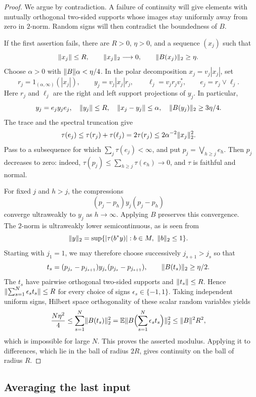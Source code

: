 \begin{proof}
We argue by contradiction.  A failure of continuity will give elements
with mutually orthogonal two-sided supports whose images stay uniformly
away from zero in $2$-norm.  Random signs will then contradict the
boundedness of $B$.

If the first assertion fails, there are $R>0$, $\eta>0$, and a sequence
$(x_j)$ such that
\[
 \lVert x_j\rVert\le R,\qquad \lVert x_j\rVert_2\longrightarrow0,
 \qquad \lVert B(x_j)\rVert_2\ge\eta.
\]
Choose $\alpha>0$ with $\lVert B\rVert\alpha<\eta/4$.  In the polar
decomposition $x_j=v_j|x_j|$, set
\[
 r_j=1_{(\alpha,\infty)}(|x_j|),\qquad
 y_j=v_j|x_j|r_j,\qquad
 \ell_j=v_jr_jv_j^*,\qquad e_j=r_j\vee\ell_j.
\]
Here $r_j$ and $\ell_j$ are the right and left support projections of
$y_j$.  In particular,
\[
 y_j=e_jy_je_j,\quad \lVert y_j\rVert\le R,\quad
 \lVert x_j-y_j\rVert\le\alpha,\quad
 \lVert B(y_j)\rVert_2\ge 3\eta/4.
\]
The trace and the spectral truncation give
\[
 \tau(e_j)\le\tau(r_j)+\tau(\ell_j)
 =2\tau(r_j)\le2\alpha^{-2}\lVert x_j\rVert_2^2.
\]
Pass to a subsequence for which $\sum_j\tau(e_j)<\infty$, and put
$p_j=\bigvee_{h\ge j}e_h$.  Then $p_j$ decreases to zero: indeed,
$\tau(p_j)\le\sum_{h\ge j}\tau(e_h)\to0$, and $\tau$ is faithful
and normal.

For fixed $j$ and $h>j$, the compressions
\[
 (p_j-p_h)y_j(p_j-p_h)
\]
converge ultraweakly to $y_j$ as $h\to\infty$.  Applying $B$ preserves
this convergence.  The $2$-norm is ultraweakly lower semicontinuous,
as is seen from
\[
 \lVert y\rVert_2=
 \sup\{ |\tau(b^*y)|:b\in M,\ \lVert b\rVert_2\le1\}.
\]
Starting with $j_1=1$, we may therefore choose successively
$j_{s+1}>j_s$ so that
\[
 t_s=(p_{j_s}-p_{j_{s+1}})y_{j_s}(p_{j_s}-p_{j_{s+1}}),
 \qquad \lVert B(t_s)\rVert_2\ge\eta/2.
\]
The $t_s$ have pairwise orthogonal two-sided supports and
$\lVert t_s\rVert\le R$.  Hence
$\lVert\sum_{s=1}^N\epsilon_st_s\rVert\le R$ for every choice of signs
$\epsilon_s\in\{-1,1\}$.  Taking independent uniform signs, Hilbert
space orthogonality of these scalar random variables yields
\[
 \frac{N\eta^2}{4}
 \le\sum_{s=1}^N\lVert B(t_s)\rVert_2^2
 =\mathbb E\lVert B\Bigl(\sum_{s=1}^N\epsilon_st_s\Bigr)\rVert_2^2
 \le\lVert B\rVert^2R^2,
\]
which is impossible for large $N$.  This proves the asserted modulus.
Applying it to differences, which lie in the ball of radius $2R$,
gives continuity on the ball of radius $R$.
\end{proof}

\subsection{Averaging the last input}

